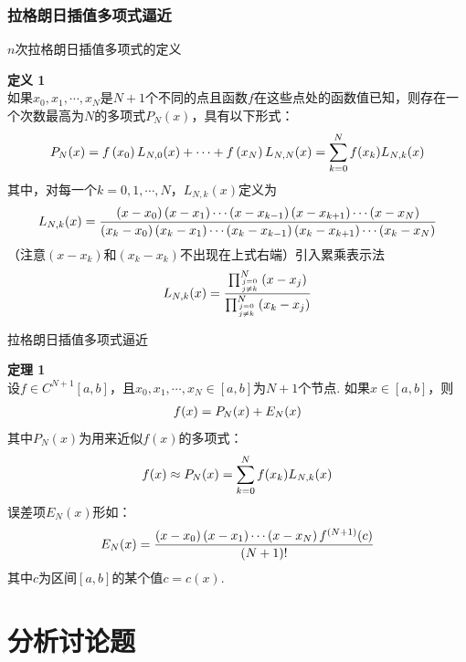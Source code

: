 \documentclass[UTF8]{ctexart}
\newenvironment{dingyi}[2][定义]
{\begin{mdframed}[backgroundcolor=gray!20] \textbf{#1 #2} \\}
	{\end{mdframed}}
\newenvironment{dingli}[2][定理]
{\begin{mdframed}[backgroundcolor=gray!20] \textbf{#1 #2} \\}
	{\end{mdframed}}
\begin{document}
\subsubsection{拉格朗日插值多项式逼近}
$n$次拉格朗日插值多项式的定义
\begin{dingyi}{1}
	如果$x_{0},x_{1},\cdots,x_{N}$是$N+1$个不同的点且函数$f$在这些点处的函数值已知，则存在一个次数最高为$N$的多项式$P_{N}(x)$，具有以下形式：
	\begin{align}
		P_{N}(x)=f\left(x_{0}\right) L_{N, 0}(x)+\cdots+f\left(x_{N}\right) L_{N, N}(x)=\sum_{k=0}^{N} f(x_{k}) L_{N, k}(x)\notag
	\end{align}
	其中，对每一个$k=0,1,\cdots,N$，$L_{N, k}(x)$定义为
	\begin{align}
		L_{N, k}(x)=\frac{\left(x-x_{0}\right)\left(x-x_{1}\right) \cdots\left(x-x_{k-1}\right)\left(x-x_{k+1}\right) \cdots\left(x-x_{N}\right)}{\left(x_{k}-x_{0}\right)\left(x_{k}-x_{1}\right) \cdots\left(x_{k}-x_{k-1}\right)\left(x_{k}-x_{k+1}\right) \cdots\left(x_{k}-x_{N}\right)}\notag
	\end{align}
	（注意$\left(x-x_{k}\right)$和$\left(x_{k}-x_{k}\right)$不出现在上式右端）引入累乘表示法
	\begin{align}
		L_{N, k}(x)=\frac{\prod_{j=0 \atop j \neq k}^{N}\left(x-x_{j}\right)}{\prod_{j=0 \atop j \neq k}^{N}\left(x_{k}-x_{j}\right)}\notag
	\end{align}
\end{dingyi}
拉格朗日插值多项式逼近
\begin{dingli}{1}
	设$f \in C^{N+1}[a,b]$，且$x_{0},x_{1},\cdots,x_{N} \in [a,b]$为$N+1$个节点. 如果$x \in [a,b]$，则
	\begin{align}
		f(x)=P_{N}(x)+E_{N}(x)\notag
	\end{align}
	其中$P_{N}(x)$为用来近似$f(x)$的多项式：
	\begin{align}
		f(x) \approx P_{N}(x)=\sum_{k=0}^{N} f(x_{k}) L_{N, k}(x)\notag
	\end{align}
	误差项$E_{N}(x)$形如：
	\begin{align}
		E_{N}(x)=\frac{\left(x-x_{0}\right)\left(x-x_{1}\right) \cdots\left(x-x_{N}\right) f^{(N+1)}(c)}{(N+1) !}\notag
	\end{align}
	其中$c$为区间$[a,b]$的某个值$c=c(x)$.
\end{dingli}

\section{分析讨论题}
\end{document}
